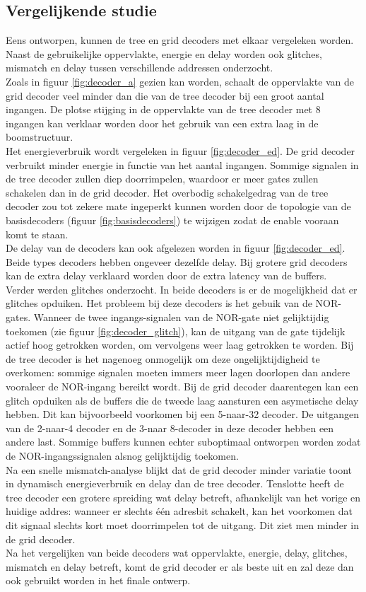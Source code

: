 \subsection{Vergelijkende studie}
Eens ontworpen, kunnen de tree en grid decoders met elkaar vergeleken worden. Naast de gebruikelijke oppervlakte, energie en delay worden ook glitches, mismatch en delay tussen verschillende addressen onderzocht. \\
Zoals in figuur \ref{fig:decoder_a} gezien kan worden, schaalt de oppervlakte van de grid decoder veel minder dan die van de tree decoder bij een groot aantal ingangen. De plotse stijging in de oppervlakte van de tree decoder met 8 ingangen kan verklaar worden door het gebruik van een extra laag in de boomstructuur. \\
Het energieverbruik wordt vergeleken in figuur \ref{fig:decoder_ed}. De grid decoder verbruikt minder energie in functie van het aantal ingangen. Sommige signalen in de tree decoder zullen diep doorrimpelen, waardoor er meer gates zullen schakelen dan in de grid decoder.  Het overbodig schakelgedrag van de tree decoder zou tot zekere mate ingeperkt kunnen worden door de topologie van de basisdecoders (figuur \ref{fig:basisdecoders}) te wijzigen zodat de enable vooraan komt te staan.\\
De delay van de decoders kan ook afgelezen worden in figuur \ref{fig:decoder_ed}. Beide types decoders hebben ongeveer dezelfde delay. Bij grotere grid decoders kan de extra delay verklaard worden door de extra latency van de buffers.\\
Verder werden glitches onderzocht. In beide decoders is er de mogelijkheid dat er glitches opduiken. Het probleem bij deze decoders is het gebuik van de NOR-gates. Wanneer de twee ingangs-signalen van de NOR-gate niet gelijktijdig toekomen (zie figuur \ref{fig:decoder_glitch}), kan de uitgang van de gate tijdelijk actief hoog getrokken worden, om vervolgens weer laag getrokken te worden. Bij de tree decoder is het nagenoeg onmogelijk om deze ongelijktijdigheid te overkomen: sommige signalen moeten immers meer lagen doorlopen dan andere vooraleer de NOR-ingang bereikt wordt. Bij de grid decoder daarentegen kan een glitch opduiken als de buffers die de tweede laag aansturen een asymetische delay hebben. Dit kan bijvoorbeeld voorkomen bij een 5-naar-32 decoder. De uitgangen van de 2-naar-4 decoder en de 3-naar 8-decoder in deze decoder hebben een andere last. Sommige buffers kunnen echter suboptimaal ontworpen worden zodat de NOR-ingangssignalen alsnog gelijktijdig toekomen.\\
Na een snelle mismatch-analyse blijkt dat de grid decoder minder variatie toont in dynamisch energieverbruik en delay dan de tree decoder. Tenslotte heeft de tree decoder een grotere spreiding wat delay betreft, afhankelijk van het vorige en huidige addres: wanneer er slechts één adresbit schakelt, kan het voorkomen dat dit signaal slechts kort moet doorrimpelen tot de uitgang. Dit ziet men minder in de grid decoder. \\
Na het vergelijken van beide decoders wat oppervlakte, energie, delay, glitches, mismatch en delay betreft, komt de grid decoder er als beste uit en zal deze dan ook gebruikt worden in het finale ontwerp.


